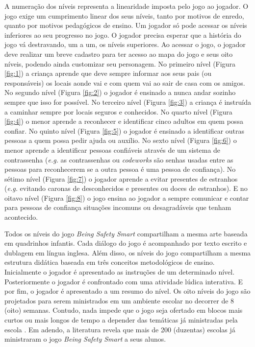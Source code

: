 A numeração dos níveis representa a linearidade imposta pelo jogo ao jogador. O jogo exige um cumprimento linear dos seus níveis, tanto por motivos de enredo, quanto por motivos pedagógicos de ensino. Um jogador só pode acessar os níveis inferiores ao seu progresso no jogo. O jogador precisa esperar que a história do jogo vá destravando, um a um, os níveis superiores. Ao acessar o jogo, o jogador deve realizar um breve cadastro para ter acesso ao mapa do jogo e seus oito níveis, podendo ainda customizar seu personagem. No primeiro nível (Figura \ref{fig:1}) a criança aprende que deve sempre informar aos seus pais (ou responsáveis) os locais aonde vai e com quem vai ao sair de casa com os amigos. No segundo nível (Figura \ref{fig:2}) o jogador é ensinado a nunca andar sozinho sempre que isso for possível. No terceiro nível (Figura \ref{fig:3}) a criança é instruída a caminhar sempre por locais seguros e conhecidos. No quarto nível (Figura \ref{fig:4}) o menor aprende a reconhecer e identificar cinco adultos em quem possa confiar. No quinto nível (Figura \ref{fig:5}) o jogador é ensinado a identificar outras pessoas a quem possa pedir ajuda ou auxílio. No sexto nível (Figura \ref{fig:6}) o menor aprende a identificar pessoas confiáveis através de um sistema de contrassenha (\textit{e.g.} as contrassenhas ou \textit{codeworks} são senhas usadas entre as pessoas para reconhecerem se a outra pessoa é uma pessoa de confiança). No sétimo nível (Figura \ref{fig:7}) o jogador aprende a evitar presentes de estranhos (\textit{e.g.} evitando caronas de desconhecidos e presentes ou doces de estranhos). E no oitavo nível (Figura \ref{fig:8}) o jogo ensina ao jogador a sempre comunicar e contar para pessoas de confiança situações incomuns ou desagradáveis que tenham acontecido. 

Todos os níveis do jogo \textit{Being Safety Smart} compartilham a mesma arte baseada em quadrinhos infantis. Cada diálogo do jogo é acompanhado por texto escrito e dublagem em língua inglesa. Além disso, os níveis do jogo compartilham a mesma estrutura didática baseada em três conceitos metodológicos de ensino. Inicialmente o jogador é apresentado as instruções de um determinado nível. Posteriormente o jogador é confrontado com uma atividade lúdica interativa. E por fim, o jogador é apresentado a um resumo do nível. Os oito níveis do jogo são projetados para serem ministrados em um ambiente escolar no decorrer de 8 (oito) semanas. Contudo, nada impede que o jogo seja ofertado em blocos mais curtos ou mais longos de tempo a depender das temáticas já ministradas pela escola \cite{jones2010being}. Em adendo, a literatura revela que mais de 200 (duzentas) escolas já ministraram o jogo \textit{Being Safety Smart} a seus alunos.

